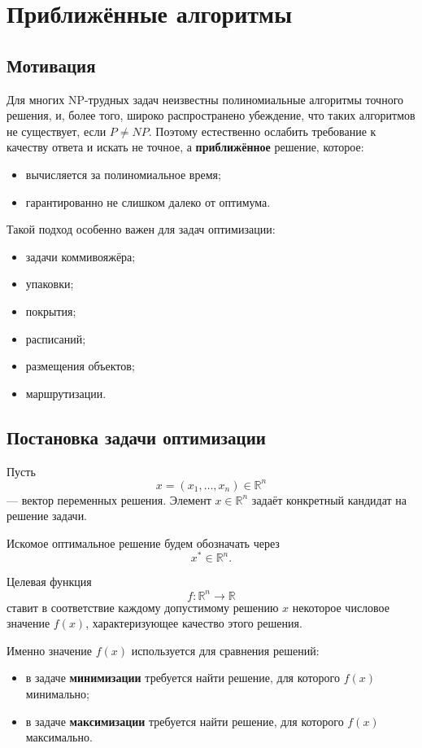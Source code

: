 \documentclass[12pt,a4paper]{article}
\theoremstyle{definition}
\theoremstyle{plain}
\begin{document}
\section{Приближённые алгоритмы}

\subsection{Мотивация}
Для многих NP-трудных задач неизвестны полиномиальные алгоритмы точного решения, и, более того, широко распространено убеждение, что таких алгоритмов не существует, если $P\ne NP$. Поэтому естественно ослабить требование к качеству ответа и искать не точное, а \textbf{приближённое} решение, которое:
\begin{itemize}
\item вычисляется за полиномиальное время;
\item гарантированно не слишком далеко от оптимума.
\end{itemize}

Такой подход особенно важен для задач оптимизации:
\begin{itemize}
\item задачи коммивояжёра;
\item упаковки;
\item покрытия;
\item расписаний;
\item размещения объектов;
\item маршрутизации.
\end{itemize}

\subsection{Постановка задачи оптимизации}
Пусть
\[
x=(x_1,\dots,x_n)\in \mathbb{R}^n
\]
--- вектор переменных решения. Элемент $x\in \mathbb{R}^n$ задаёт конкретный кандидат на решение задачи.

Искомое оптимальное решение будем обозначать через
\[
x^*\in \mathbb{R}^n.
\]

Целевая функция
\[
f:\mathbb{R}^n\to\mathbb{R}
\]
ставит в соответствие каждому допустимому решению $x$ некоторое числовое значение $f(x)$, характеризующее качество этого решения.

Именно значение $f(x)$ используется для сравнения решений:
\begin{itemize}
\item в задаче \textbf{минимизации} требуется найти решение, для которого $f(x)$ минимально;
\item в задаче \textbf{максимизации} требуется найти решение, для которого $f(x)$ максимально.
\end{itemize}
\end{document}
